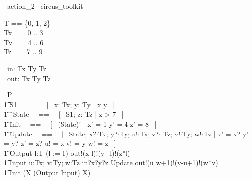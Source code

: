 \begin{zsection}
  \SECTION\ action\_2 \parents\ circus\_toolkit
\end{zsection}

\begin{zed}
    T == \{0, 1, 2\} \\
	Tx == 0 .. 3 \\ 
	Ty == 4 .. 6 \\ 
	Tz == 7 .. 9 \\ 
\end{zed}

\begin{circus}
	\circchannel\ in: Tx \cross Ty \cross Tz \\
	\circchannel\ out: Tx \cross Ty \cross Tz \\
\end{circus}

\begin{circus}
    \circprocess\ P \circdef \circbegin \\
        \t1 S1 ~~==~~ [~  x: Tx; y: Ty | x  \land y  ~] \\
        \t1 \circstate\ State ~~==~~ [~ S1; z: Tz | z > 7 ~] \\
        \t1 Init ~~==~~ [~ (State)' | x' = 1 \land y' = 4 \land z' = 8 ~] \\
        \t1 Update ~~==~~ [~ \Delta State; x?:Tx; y?:Ty; u!:Tx; z?: Tz; v!:Ty; w!:Tz | x' = x? \land y' = y? \land z' = z? \land u! = x \land v! = y \land w! = z ~] \\
        \t1 Output \circdef \circvar l:T \circspot (l := 1) \circseq out!(x-l)!(y+l)!(z*l) \then \Skip \\
        \t1 Input \circdef \circvar u:Tx; v:Ty; w:Tz \circspot in?x?y?z \then \lschexpract Update \rschexpract \circseq out!(u \div w+1)!(v-u+1)!(w*v) \then \Skip \\
        \t1 \circspot \lschexpract Init \rschexpract \circseq (\circmu X \circspot (Output \extchoice Input) \circseq X) \\ 
	\circend
\end{circus}

